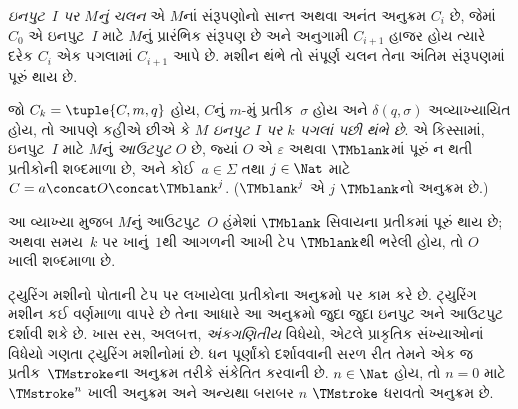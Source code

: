 \begin{defn}
\emph{ઇનપુટ~$I$ પર $M$નું ચલન} એ $M$નાં સંરૂપણોનો
સાન્ત અથવા અનંત અનુક્રમ $C_i$ છે, જેમાં $C_0$ એ ઇનપુટ~$I$ માટે
$M$નું પ્રારંભિક સંરૂપણ છે અને અનુગામી $C_{i+1}$ હાજર હોય
ત્યારે દરેક $C_i$ એક પગલામાં $C_{i+1}$ આપે છે. મશીન થંભે
તો સંપૂર્ણ ચલન તેના અંતિમ સંરૂપણમાં પૂરું થાય છે.

જો $C_k = \tuple{C, m, q}$ હોય, $C$નું $m$-મું
પ્રતીક~$\sigma$ હોય અને $\delta(q, \sigma)$ અવ્યાખ્યાયિત
હોય, તો આપણે કહીએ છીએ કે $M$ \emph{ઇનપુટ $I$ પર
$k$ પગલાં પછી થંભે છે}. એ કિસ્સામાં, ઇનપુટ~$I$ માટે
$M$નું \emph{આઉટપુટ} $O$ છે, જ્યાં $O$ એ
$\varepsilon$ અથવા $\TMblank$માં પૂરું ન થતી પ્રતીકોની
શબ્દમાળા છે, અને કોઈ~$a\in\Sigma$ તથા $j \in \Nat$ માટે
$C = a \concat O \concat \TMblank^j$.
($\TMblank^j$ એ $j$ $\TMblank$નો અનુક્રમ છે.)
\end{defn}

\begin{explain}
આ વ્યાખ્યા મુજબ $M$નું આઉટપુટ~$O$ હંમેશાં
$\TMblank$ સિવાયના પ્રતીકમાં પૂરું થાય છે; અથવા
સમય~$k$ પર ખાનું~$1$થી આગળની આખી ટેપ $\TMblank$થી
ભરેલી હોય, તો $O$ ખાલી
શબ્દમાળા છે.
\end{explain}

\endgroup


\begingroup
\makeatletter{}\makeatother

\label{guunit:OLP-0258}


\begin{explain}
ટ્યુરિંગ મશીનો પોતાની ટેપ પર લખાયેલા પ્રતીકોના અનુક્રમો
પર કામ કરે છે. ટ્યુરિંગ મશીન કઈ વર્ણમાળા વાપરે છે તેના
આધારે આ અનુક્રમો જુદા જુદા ઇનપુટ અને આઉટપુટ દર્શાવી
શકે છે. ખાસ રસ, અલબત્ત, \emph{અંકગણિતીય} વિધેયો,
એટલે પ્રાકૃતિક સંખ્યાઓનાં વિધેયો ગણતા ટ્યુરિંગ મશીનોમાં
છે. ધન પૂર્ણાંકો દર્શાવવાની સરળ રીત તેમને એક જ
પ્રતીક~$\TMstroke$ના અનુક્રમ તરીકે સંકેતિત કરવાની છે.
$n \in \Nat$ હોય, તો $n = 0$ માટે $\TMstroke^n$
ખાલી અનુક્રમ અને અન્યથા બરાબર $n$ $\TMstroke$ ધરાવતો
અનુક્રમ છે.
\end{explain}

